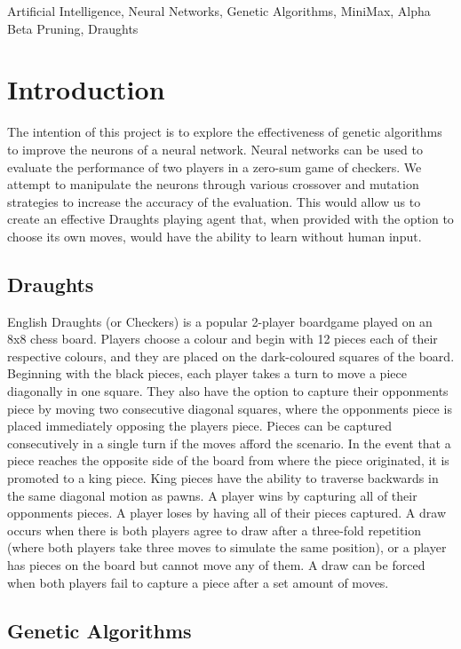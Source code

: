 \documentclass[12pt,a4paper]{article}
\begin{document}
\begin{keywords}
    Artificial Intelligence, Neural Networks, Genetic Algorithms, MiniMax, Alpha Beta Pruning, Draughts
\end{keywords}

\section{Introduction}

    The intention of this project is to explore the effectiveness of genetic algorithms to improve the neurons of a neural network. Neural networks can be used to evaluate the performance of two players in a zero-sum game of checkers. We attempt to manipulate the neurons through various crossover and mutation strategies to increase the accuracy of the evaluation. This would allow us to create an effective Draughts playing agent that, when provided with the option to choose its own moves, would have the ability to learn without human input.

\subsection*{Draughts}

    English Draughts (or Checkers) is a popular 2-player boardgame played on an 8x8 chess board. Players choose a colour and begin with 12 pieces each of their respective colours, and they are placed on the dark-coloured squares of the board. Beginning with the black pieces, each player takes a turn to move a piece diagonally in one square. They also have the option to capture their opponments piece by moving two consecutive diagonal squares, where the opponments piece is placed immediately opposing the players piece. Pieces can be captured consecutively in a single turn if the moves afford the scenario. In the event that a piece reaches the opposite side of the board from where the piece originated, it is promoted to a king piece. King pieces have the ability to traverse backwards in the same diagonal motion as pawns. A player wins by capturing all of their opponments pieces. A player loses by having all of their pieces captured. A draw occurs when there is both players agree to draw after a three-fold repetition (where both players take three moves to simulate the same position), or a player has pieces on the board but cannot move any of them. A draw can be forced when both players fail to capture a piece after a set amount of moves.

\subsection*{Genetic Algorithms}
\end{document}
